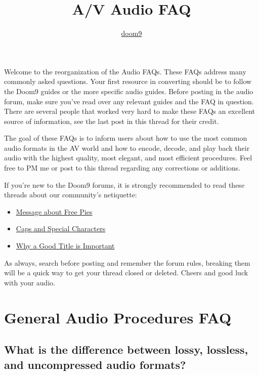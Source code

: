 ﻿\documentclass[12pt]{article}
\title{A/V Audio FAQ}
\author{\hyperlink{http://www.doom9.org/faqs.htm}{doom9}}
\date{}
\begin{document}
\maketitle

\thispagestyle{empty}
{\footnotesize\textsf{\tableofcontents}}
\clearpage
\setcounter{page}{1}

Welcome to the reorganization of the Audio FAQs. These FAQs address many commonly asked questions.
Your first resource in converting should be to follow the Doom9 guides or the more specific audio
guides. Before posting in the audio forum, make sure you've read over any relevant guides and the
FAQ in question. There are several people that worked very hard to make these FAQs an excellent
source of information, see the last post in this thread for their credit.

The goal of these FAQs is to inform users about how to use the most common audio formats in the AV
world and how to encode, decode, and play back their audio with the highest quality, most elegant,
and most efficient procedures. Feel free to PM me or post to this thread regarding any corrections
or additions.

If you're new to the Doom9 forums, it is strongly recommended to read these threads about our
community's netiquette:
\begin{itemize}
    \item \hyperlink{http://forum.doom9.org/showthread.php?s=&threadid=7770}{Message about Free Pies}
    \item \hyperlink{http://forum.doom9.org/showthread.php?s=&threadid=51632}{Caps and Special Characters}
    \item \hyperlink{http://forum.doom9.org/showthread.php?s=&threadid=49236}{Why a Good Title is Important}
\end{itemize}

As always, search before posting and remember the forum rules, breaking them will be a quick way to
get your thread closed or deleted. Cheers and good luck with your audio.

\section{General Audio Procedures FAQ}

\subsection{What is the difference between lossy, lossless, and uncompressed audio formats?}
\end{document}
